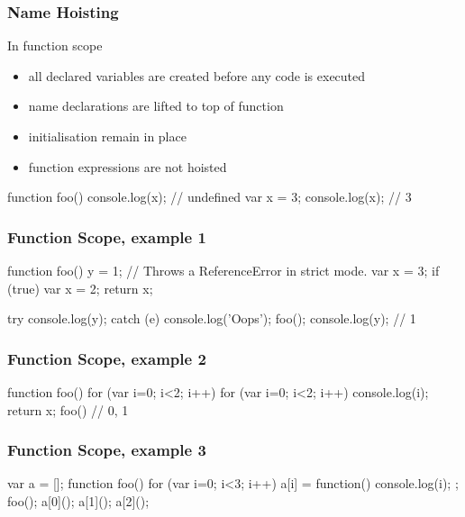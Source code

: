 \begin{frame}[fragile] \frametitle{Name Hoisting}
In function scope
\begin{itemize}
  \item all declared variables are created before any code is executed
  \item name declarations are lifted to top of function
  \item initialisation remain in place
  \item function expressions are not hoisted
\end{itemize}

\begin{CodeBox}{}
function foo() {
  console.log(x);  // undefined
  var x = 3;
  console.log(x);  // 3
}
\end{CodeBox}
\end{frame}

\begin{frame}[fragile] \frametitle{Function Scope, example 1}

\begin{CodeBox}{}
function foo() {
  y = 1; // Throws a ReferenceError in strict mode.
  var x = 3;
  if (true) {
    var x = 2;
  }
  return x;
}

try {
  console.log(y);
} catch (e) {  console.log('Oops');  }
foo();
console.log(y); // 1
\end{CodeBox}
\end{frame}

\begin{frame}[fragile] \frametitle{Function Scope, example 2}

\begin{CodeBox}{}
function foo() {
  for (var i=0; i<2; i++) {
    for (var i=0; i<2; i++) {
      console.log(i);
    }
  }
  return x;
}
foo()  // 0, 1
\end{CodeBox}
\end{frame}

\begin{frame}[fragile] \frametitle{Function Scope, example 3}

\begin{CodeBox}{}
var a = [];
function foo() {
  for (var i=0; i<3; i++) {
    a[i] = function() { console.log(i); };
  }
}
foo();
a[0]();
a[1]();
a[2]();
\end{CodeBox}
\end{frame}

